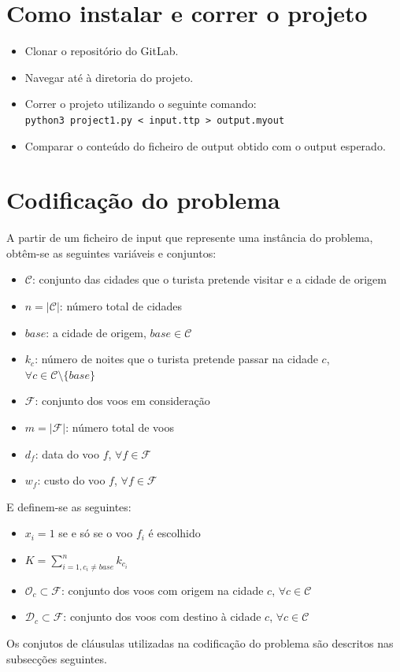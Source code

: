 \documentclass[12pt,a4paper]{article}
\begin{document}
    \section{Como instalar e correr o projeto}
        \begin{itemize}
            \item Clonar o repositório do GitLab.
            \item Navegar até à diretoria do projeto.
            \item Correr o projeto utilizando o seguinte comando: \\
                  \texttt{python3 project1.py < input.ttp > output.myout}
            \item Comparar o conteúdo do ficheiro de output obtido com o output esperado.
        \end{itemize}

    \section{Codificação do problema}
        A partir de um ficheiro de input que represente uma instância do problema, obtêm-se as seguintes variáveis e conjuntos:
        \begin{itemize}
            \item $\mathcal{C}$: conjunto das cidades que o turista pretende visitar e a cidade de origem
            \item $n = \lvert \mathcal{C} \rvert$: número total de cidades
            \item $base$: a cidade de origem, $base \in \mathcal{C}$
            \item $k_c$: número de noites que o turista pretende passar na cidade $c$,
                  $\forall c \in \mathcal{C} \setminus \{base\}$
            \item $\mathcal{F}$: conjunto dos voos em consideração
            \item $m = \lvert \mathcal{F} \rvert$: número total de voos
            \item $d_f$: data do voo $f$, $\forall f \in \mathcal{F}$
            \item $w_f$: custo do voo $f$, $\forall f \in \mathcal{F}$
        \end{itemize}
        E definem-se as seguintes:
        \begin{itemize}
            \item $x_i = 1$ se e só se o voo $f_i$ é escolhido
            \item $K = \sum_{i = 1, c_i \neq base}^{n}{k_{c_i}}$
            \item $\mathcal{O}_c \subset \mathcal{F}$: conjunto dos voos com origem na cidade $c$, $\forall c \in \mathcal{C}$
            \item $\mathcal{D}_c \subset \mathcal{F}$: conjunto dos voos com destino à cidade $c$, $\forall c \in \mathcal{C}$
        \end{itemize}
        Os conjutos de cláusulas utilizadas na codificação do problema são descritos nas subsecções seguintes.
\end{document}
